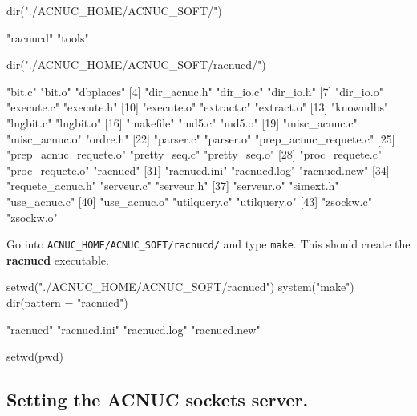 \documentclass{article}
\begin{document}
\begin{Schunk}
\begin{Sinput}
 dir("./ACNUC_HOME/ACNUC_SOFT/")
\end{Sinput}
\begin{Soutput}
[1] "racnucd" "tools"  
\end{Soutput}
\begin{Sinput}
 dir("./ACNUC_HOME/ACNUC_SOFT/racnucd/")
\end{Sinput}
\begin{Soutput}
 [1] "bit.c"                "bit.o"                "dbplaces"            
 [4] "dir_acnuc.h"          "dir_io.c"             "dir_io.h"            
 [7] "dir_io.o"             "execute.c"            "execute.h"           
[10] "execute.o"            "extract.c"            "extract.o"           
[13] "knowndbs"             "lngbit.c"             "lngbit.o"            
[16] "makefile"             "md5.c"                "md5.o"               
[19] "misc_acnuc.c"         "misc_acnuc.o"         "ordre.h"             
[22] "parser.c"             "parser.o"             "prep_acnuc_requete.c"
[25] "prep_acnuc_requete.o" "pretty_seq.c"         "pretty_seq.o"        
[28] "proc_requete.c"       "proc_requete.o"       "racnucd"             
[31] "racnucd.ini"          "racnucd.log"          "racnucd.new"         
[34] "requete_acnuc.h"      "serveur.c"            "serveur.h"           
[37] "serveur.o"            "simext.h"             "use_acnuc.c"         
[40] "use_acnuc.o"          "utilquery.c"          "utilquery.o"         
[43] "zsockw.c"             "zsockw.o"            
\end{Soutput}
\end{Schunk}

Go into \texttt{ACNUC\_HOME/ACNUC\_SOFT/racnucd/} and type \texttt{make}.
This should create the \textbf{racnucd} executable.

\begin{Schunk}
\begin{Sinput}
 setwd("./ACNUC_HOME/ACNUC_SOFT/racnucd")
 system("make")
 dir(pattern = "racnucd")
\end{Sinput}
\begin{Soutput}
[1] "racnucd"     "racnucd.ini" "racnucd.log" "racnucd.new"
\end{Soutput}
\begin{Sinput}
 setwd(pwd)
\end{Sinput}
\end{Schunk}

\subsection{Setting the ACNUC sockets server.}
\end{document}
